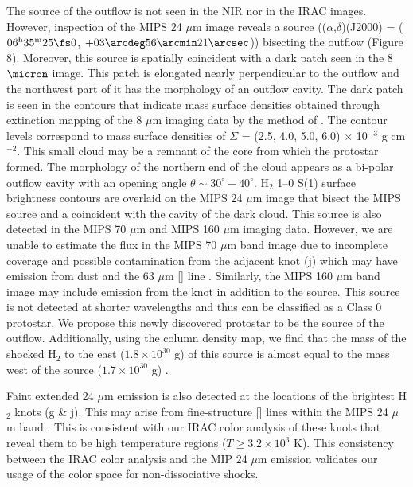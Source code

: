 \documentclass[iop]{emulateapj}
\begin{document}
The source of the outflow is not seen in the NIR nor in the IRAC images.
However, inspection of the MIPS 24 $\mu$m image reveals a source
(($\alpha$,$\delta$)(J2000) =
($06^{\rm{h}}35^{\rm{m}}25\fs 0$, $+03\arcdeg56\arcmin21\arcsec$))
bisecting
the outflow (Figure 8). Moreover, this source is spatially coincident with a 
dark patch seen in the 8 $\micron$ image. 
This patch is elongated nearly perpendicular to the outflow and the northwest part of it 
has the morphology of an outflow cavity. 
The dark patch is seen in the contours that indicate mass surface densities  
obtained through extinction mapping of the 8 $\mu$m imaging data by the method 
of \citet{but2009}. The contour levels correspond to mass surface densities of
$\Sigma$ = (2.5, 4.0, 5.0, 6.0) $\times$ 10$^{-3}$ g cm$^{-2}$. 
This small cloud may be a remnant of the core from which the protostar formed.  
The morphology of the 
northern end of the cloud appears as a bi-polar outflow cavity with an 
opening angle $\theta \sim 30^{\circ}-40^{\circ}$. 
H$_2$ 1--0 S(1) surface brightness contours are overlaid on the MIPS 24 $\mu$m 
image that bisect the MIPS source and a coincident with the cavity of 
the dark cloud. 
This source is also detected in the MIPS 70 $\mu$m 
and MIPS 160 $\mu$m imaging data.
However, we are unable to estimate the flux in the MIPS 70 $\mu$m band image 
due to  incomplete coverage and possible contamination 
from the adjacent knot (j) which may 
have emission from dust and the 63 $\mu$m [] line \citep{rei2001}.
Similarly, the MIPS 160 $\mu$m band image may include emission
from the knot in addition to the source. 
This source is not detected at shorter wavelengths and thus
can be classified as a Class 0 protostar. 
We propose this newly discovered protostar to be the source of the outflow. 
Additionally, using the column density map, we find that the mass of the 
shocked H$_{2}$ to the east 
($1.8 \times 10^{30}$ g) of this source is almost equal 
to the mass west of the source ($1.7 \times 10^{30}$ g) .


Faint extended 24 $\mu$m emission is also detected at the locations of the 
brightest H$_2$ knots (g \& j). 
This may arise from fine-structure [] lines 
within the MIPS 24 $\mu$m band \citep{vel2007}.  This is consistent with our IRAC color analysis 
of these knots that reveal them to be high temperature regions ($T \geq 3.2 \times 10^{3}$ K).
This consistency between the IRAC color analysis and the MIP 24 $\mu$m emission validates 
our usage of the color space for non-dissociative shocks.
\end{document}
